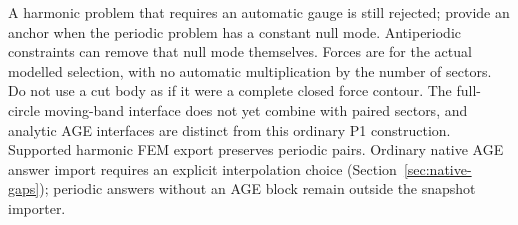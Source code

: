 
A harmonic problem that requires an automatic gauge is still rejected; provide
an anchor when the periodic problem has a constant null mode. Antiperiodic
constraints can remove that null mode themselves. Forces are for the actual
modelled selection, with no automatic multiplication by the number of sectors.
Do not use a cut body as if it were a complete closed force contour. The
full-circle moving-band interface does not yet combine with paired sectors,
and analytic AGE interfaces are distinct from this ordinary P1 construction.
Supported harmonic FEM export preserves periodic pairs. Ordinary native AGE
answer import requires an explicit interpolation choice (Section~\ref{sec:native-gaps});
periodic answers without an AGE block remain outside the snapshot importer.

